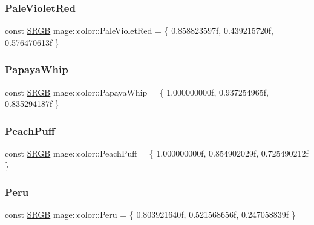 \hypertarget{namespacemage_1_1color_ab98ff7d1a23ee6285f8c9f17abc452d6}{}\label{namespacemage_1_1color_ab98ff7d1a23ee6285f8c9f17abc452d6} 
\subsubsection{\texorpdfstring{Pale\+Violet\+Red}{PaleVioletRed}}
{\footnotesize\ttfamily const \hyperlink{structmage_1_1_s_r_g_b}{S\+R\+GB} mage\+::color\+::\+Pale\+Violet\+Red = \{ 0.\+858823597f, 0.\+439215720f, 0.\+576470613f \}}

\hypertarget{namespacemage_1_1color_acb807bd54e2d278c60f516cc245dd52e}{}\label{namespacemage_1_1color_acb807bd54e2d278c60f516cc245dd52e} 
\subsubsection{\texorpdfstring{Papaya\+Whip}{PapayaWhip}}
{\footnotesize\ttfamily const \hyperlink{structmage_1_1_s_r_g_b}{S\+R\+GB} mage\+::color\+::\+Papaya\+Whip = \{ 1.\+000000000f, 0.\+937254965f, 0.\+835294187f \}}

\hypertarget{namespacemage_1_1color_a7cb79ef8e99d5f5d48d859ef2a4dc0f3}{}\label{namespacemage_1_1color_a7cb79ef8e99d5f5d48d859ef2a4dc0f3} 
\subsubsection{\texorpdfstring{Peach\+Puff}{PeachPuff}}
{\footnotesize\ttfamily const \hyperlink{structmage_1_1_s_r_g_b}{S\+R\+GB} mage\+::color\+::\+Peach\+Puff = \{ 1.\+000000000f, 0.\+854902029f, 0.\+725490212f \}}

\hypertarget{namespacemage_1_1color_a7e55a4957e0be16f89eaad2949b4fe67}{}\label{namespacemage_1_1color_a7e55a4957e0be16f89eaad2949b4fe67} 
\subsubsection{\texorpdfstring{Peru}{Peru}}
{\footnotesize\ttfamily const \hyperlink{structmage_1_1_s_r_g_b}{S\+R\+GB} mage\+::color\+::\+Peru = \{ 0.\+803921640f, 0.\+521568656f, 0.\+247058839f \}}


